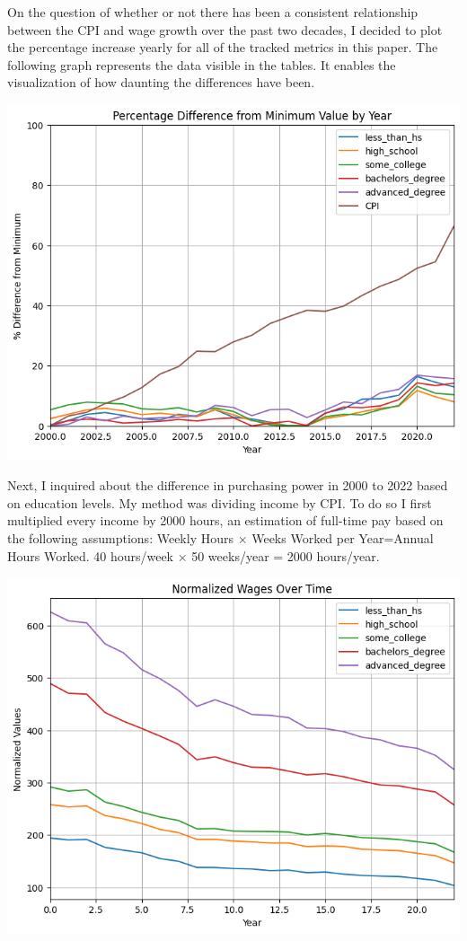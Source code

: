 \documentclass[
  letterpaper,
  DIV=11,
  numbers=noendperiod]{scrartcl}
\begin{document}
On the question of whether or not there has been a consistent
relationship between the CPI and wage growth over the past two decades,
I decided to plot the percentage increase yearly for all of the tracked
metrics in this paper. The following graph represents the data visible
in the tables. It enables the visualization of how daunting the
differences have been.

\includegraphics{Markdown_files/figure-pdf/cell-7-output-1.png}

Next, I inquired about the difference in purchasing power in 2000 to
2022 based on education levels. My method was dividing income by CPI. To
do so I first multiplied every income by 2000 hours, an estimation of
full-time pay based on the following assumptions: Weekly Hours × Weeks
Worked per Year=Annual Hours Worked. 40 hours/week × 50 weeks/year =
2000 hours/year.

\includegraphics{Markdown_files/figure-pdf/cell-8-output-1.png}
\end{document}
